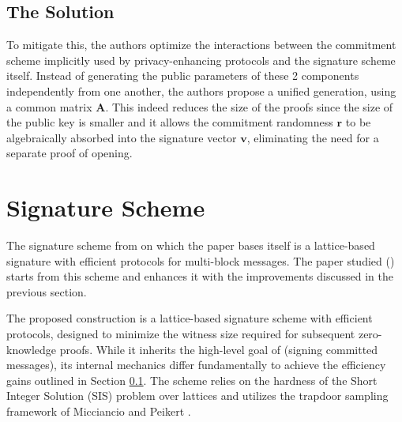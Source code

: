 \documentclass[a4paper]{article}
\begin{document}
\subsection{The Solution}
\label{solution}
To mitigate this, the authors optimize the interactions between the commitment scheme implicitly used by privacy-enhancing protocols and the
signature scheme itself. Instead of generating the public parameters of these 2 components independently from one another, the authors propose a unified
generation, using a common matrix $\mathbf{A}$. This indeed reduces the size of the proofs since the size of the
public key is smaller and it allows the commitment randomness $\mathbf{r}$ to be algebraically absorbed into the signature vector $\mathbf{v}$, eliminating
the need for a separate proof of opening.
\section{Signature Scheme}
The signature scheme from \cite{LLM+16} on which the paper bases itself is a lattice-based signature with efficient protocols for multi-block messages. 
The paper studied (\cite{mainPaper}) starts from this scheme and enhances it with the improvements discussed in the previous section.

The proposed construction is a lattice-based signature scheme with efficient protocols, designed to minimize the witness size required for subsequent
zero-knowledge proofs. While it inherits the high-level goal of \cite{LLM+16} (signing committed messages), its internal mechanics differ fundamentally
to achieve the efficiency gains outlined in Section \ref{solution}. The scheme relies on the hardness of the Short Integer Solution (SIS) problem over lattices and
utilizes the trapdoor sampling framework of Micciancio and Peikert \cite{MP12}.
\end{document}
